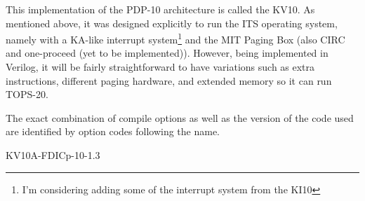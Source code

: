 \documentclass[12pt]{report}
\newcommand{\code}[1]{\textsf{#1}}
\begin{document}
This implementation of the PDP-10 architecture is called the KV10. As mentioned above, it
was designed explicitly to run the ITS operating system, namely with a KA-like interrupt
system\footnote{I'm considering adding some of the interrupt system from the KI10} and the
MIT Paging Box (also \code{CIRC} and one-proceed (yet to be implemented)). However, being
implemented in Verilog, it will be fairly straightforward to have variations such as extra
instructions, different paging hardware, and extended memory so it can run TOPS-20.

The exact combination of compile options as well as the version of the code used are 
identified by option codes following the name.

\begin{center} \large KV10A-FDICp-10-1.3 \end{center}
\end{document}
